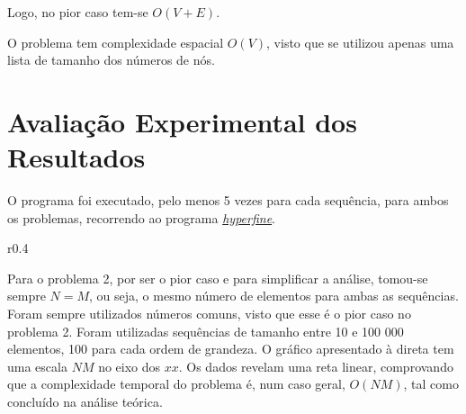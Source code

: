 \documentclass[12pt,a4paper]{article}
\begin{document}
  
  
  Logo, no pior caso tem-se $O(V + E)$.

O problema tem complexidade espacial $O(V)$, visto que se utilizou apenas uma lista de tamanho dos números de nós.

  \section{Avaliação Experimental dos Resultados}

  O programa foi executado, pelo menos 5 vezes para cada sequência, para ambos os problemas, recorrendo ao programa \href{https://github.com/sharkdp/hyperfine}{\textit{hyperfine}}.

  \begin{wrapfigure}{r}{0.4\textwidth}
    \centering
    
  \end{wrapfigure}

  Para o problema 2, por ser o pior caso e para simplificar a análise, tomou-se sempre $N = M$, ou seja, o mesmo número de elementos para ambas as sequências.
  Foram sempre utilizados números comuns, visto que esse é o pior caso no problema 2.
  Foram utilizadas sequências de tamanho entre 10 e 100 000 elementos, 100 para cada ordem de grandeza.
  O gráfico apresentado à direta tem uma escala $NM$ no eixo dos $xx$.
  Os dados revelam uma reta linear, comprovando que a complexidade temporal do problema é, num caso geral, $O(NM)$, tal como concluído na análise teórica.
\end{document}
